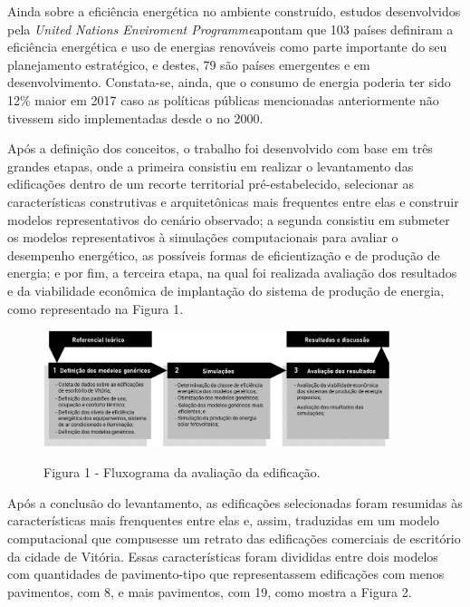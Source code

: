 \begin{onehalfspace}
    \noindent Ainda sobre a eficiência energética no ambiente construído, estudos desenvolvidos pela \textit{United Nations Enviroment Programme}apontam que 103 países definiram a eficiência energética e uso de energias renováveis como parte importante do seu planejamento estratégico, e destes, 79 são países emergentes e em desenvolvimento. Constata-se, ainda, que o consumo de energia poderia ter sido 12\% maior em 2017 caso as políticas públicas mencionadas anteriormente não tivessem sido implementadas desde o no 2000.\vspace*{0.3cm}

    \noindent Após a definição dos conceitos, o trabalho foi desenvolvido com base em três grandes etapas, onde a primeira consistiu em realizar o levantamento das edificações dentro de um recorte territorial pré-estabelecido, selecionar as características construtivas e arquitetônicas mais frequentes entre elas e construir modelos representativos do cenário observado; a segunda consistiu em submeter os modelos representativos à simulações computacionais para avaliar o desempenho energético, as possíveis formas de eficientização e de produção de energia; e por fim, a terceira etapa, na qual foi realizada avaliação dos resultados e da viabilidade econômica de implantação do sistema de produção de energia, como representado na Figura 1.\vspace*{0.3cm}
    \begin{figure}[H]
        \centering
        \includegraphics[width=0.9\textwidth]{figures/0_Fluxogramas1 (2).jpg}
        \begin{center}
            \scriptsize Figura 1 - Fluxograma da avaliação da edificação.
        \end{center}
    \end{figure}
    \noindent Após a conclusão do levantamento, as edificações selecionadas foram resumidas às características mais frenquentes entre elas e, assim, traduzidas em um modelo computacional que compusesse um retrato das edificações comerciais de escritório da cidade de Vitória. Essas características foram divididas entre dois modelos com quantidades de pavimento-tipo que representassem edificações com menos pavimentos, com 8, e mais pavimentos, com 19, como mostra a Figura 2.


\end{onehalfspace}
